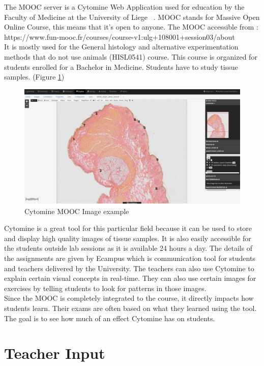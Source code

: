 \documentclass[a4paper,11pt]{report}
\numberwithin{figure}{chapter} %
\begin{document}
The MOOC server is a Cytomine Web Application used for education by the Faculty of Medicine at the University of Liege ~\cite{fun}.
MOOC stands for Massive Open Online Course, this means that it's open to anyone.
The MOOC accessible from :\\
https://www.fun-mooc.fr/courses/course-v1:ulg+108001+session03/about\\
It is mostly used for the General histology and alternative experimentation methods that do not use animals (HISL0541) course.
This course is organized for students enrolled for a Bachelor in Medicine.
Students have to study tissue samples. (Figure \ref{fig:lame_example})

      \begin{figure}[H]
      \centering
      \includegraphics[width=.95\linewidth]{images/lame_cytomine.png}
      \caption{Cytomine MOOC Image example}
      \label{fig:lame_example}
      \end{figure}

Cytomine is a great tool for this particular field because it can be used to store and display high quality images of tissue samples.
It is also easily accessible for the students outside lab sessions as it is available 24 hours a day.
The details of the assignments are given by Ecampus which is communication tool for students and teachers delivered by the University.
The teachers can also use Cytomine to explain certain visual concepts in real-time.
They can also use certain images for exercises by telling students to look for patterns in those images.\\

Since the MOOC is completely integrated to the course, it directly impacts how students learn.
Their exams are often based on what they learned using the tool.
The goal is to see how much of an effect Cytomine has on students.


\section{Teacher Input}
\end{document}
